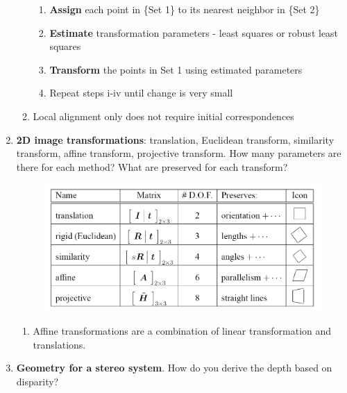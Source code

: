 \documentclass[12pt,letterpaper]{article}
\begin{document}
\begin{enumerate}
\begin{enumerate}
\begin{enumerate}
            \item \textbf{Assign} each point in \{Set 1\} to its nearest neighbor in \{Set 2\}
            \item \textbf{Estimate} transformation parameters - least squares or robust least squares 
            \item \textbf{Transform} the points in {Set 1} using estimated parameters
            \item Repeat steps i-iv until change is very small
        \end{enumerate}
        \item Local alignment only does not require initial correspondences 
    \end{enumerate}
    \color{black}
    \item \textbf{2D image transformations}: translation, Euclidean transform, similarity transform, affine transform, projective transform. How many parameters are there for each method? What are preserved for each transform?\\
    \color{red}
    \begin{figure}[h!]
        \centering
        \includegraphics[scale=0.4]{images/transform.png}
    \end{figure}
    \begin{enumerate}
        \item Affine transformations are a combination of linear transformation and translations. 
    \end{enumerate}
    \color{black}
    \item \textbf{Geometry for a stereo system}. How do you derive the depth based on disparity?\\
    \color{red}
    \begin{figure}[h!]
        \centering

\end{figure}
\end{enumerate}
\end{document}
